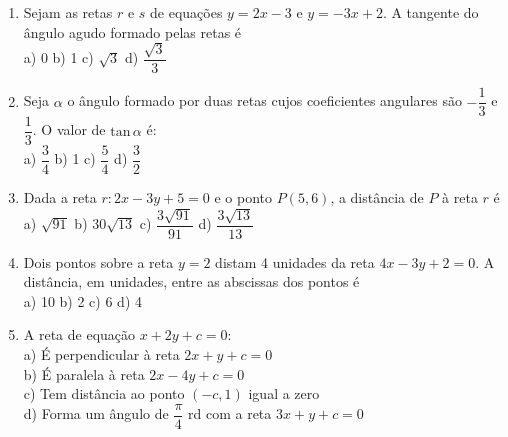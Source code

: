 \documentclass[12pt,a4paper]{report}
\providecommand{\tan}{} \renewcommand{\tan}{\mathrm{tan\,}}
\begin{document}
 
	\pagestyle{fancy}
	\noindent
	\begin{enumerate}[label=\textbf{\arabic*}.]

\item Sejam as retas $r$ e $s$ de equações $y = 2x-3$ e $y=-3x+2$. A tangente do ângulo agudo formado pelas retas é\\
a) 0\hfill
b) 1\hfill
c) $\sqrt{3}$\hfill
d) $\dfrac{\sqrt{3}}{3}$

\item Seja $\alpha$ o ângulo formado por duas retas cujos coeficientes angulares são $-\dfrac{1}{3}$ e $\dfrac{1}{3}$. O valor de $\tan \alpha$ é:\\
a) $\dfrac{3}{4}$\hfill
b) 1\hfill
c) $\dfrac{5}{4}$\hfill
d) $\dfrac{3}{2}$


\item Dada a reta $r:2x-3y+5=0$ e o ponto $P(5,6)$, a distância de $P$ à reta $r$ é\\
a) $\sqrt{91}$\hfill
b) $30\sqrt{13}$\hfill
c) $\dfrac{3\sqrt{91}}{91}$\hfill
d) $\dfrac{3\sqrt{13}}{13}$

\item Dois pontos sobre a reta $y=2$ distam 4 unidades da reta $4x-3y+2=0$. A distância, em unidades, entre as abscissas dos pontos é\\
a) 10\hfill
b) 2\hfill
c) 6\hfill
d) 4

\item A reta de equação $x+2y+c=0$:\\
a) É perpendicular à reta $2x+y+c=0$\\
b) É paralela à reta $2x-4y+c=0$\\
c) Tem distância ao ponto $(-c,1)$ igual a zero\\
d) Forma um ângulo de $\dfrac{\pi}{4}$ rd com a reta $3x+y+c=0$

\end{enumerate}
\end{document}
